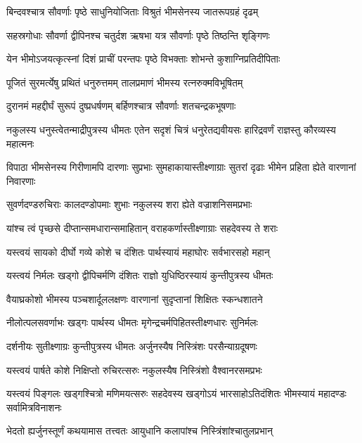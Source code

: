 \twolineshloka
{बिन्दवश्चात्र सौवर्णाः पृष्ठे साधुनियोजिताः}
{विश्रुतं भीमसेनस्य जातरूपग्रहं दृढम्}


\twolineshloka
{सहस्रगोधाः सौवर्णा द्वीपिनश्च चतुर्दश}
{ऋषभा यत्र सौवर्णाः पृष्ठे तिष्ठन्ति शृङ्गिणः}


\twolineshloka
{येन भीमोऽजयत्कृत्स्नां दिशं प्राचीं परन्तपः}
{पृष्ठे विभक्ताः शोभन्ते कुशाग्निप्रतिदीपिताः}


\twolineshloka
{पूजितं सुरमर्त्येषु प्रथितं धनुरुत्तमम्}
{तालप्रमाणं भीमस्य रत्नरुक्मविभूषितम्}


\twolineshloka
{दुरानमं महद्दीर्घं सुरूपं दुष्प्रधर्षणम्}
{बर्हिणश्चात्र सौवर्णाः शतचन्द्रकभूषणाः}


\threelineshloka
{नकुलस्य धनुस्त्वेतन्माद्रीपुत्रस्य धीमतः}
{एतेन सदृशं चित्रं धनुरेतद्यवीयसः}
{हारिद्रवर्णं राज्ञस्तु कौरव्यस्य महात्मनः}


\threelineshloka
{विपाठा भीमसेनस्य गिरीणामपि दारणाः}
{सुप्रभाः सुमहाकायास्तीक्ष्णाग्राः सुतरां दृढाः}
{भीमेन प्रहिता ह्येते वारणानां निवारणाः}


\twolineshloka
{सुवर्णदण्डरुचिराः कालदण्डोपमाः शुभाः}
{नकुलस्य शरा ह्येते वज्राशनिसमप्रभाः}


\twolineshloka
{यांश्च त्वं पृच्छसे दीप्तान्समधारान्समाहितान्}
{वराहकर्णास्तीक्ष्णाग्राः सहदेवस्य ते शराः}


\twolineshloka
{यस्त्वयं सायको दीर्घो गव्ये कोशे च दंशितः}
{पार्थस्यायं महाघोरः सर्वभारसहो महान्}


\twolineshloka
{यस्त्वयं निर्मलः खड्गो द्वीपिचर्मणि दंशितः}
{राज्ञो युधिष्ठिरस्यायं कुन्तीपुत्रस्य धीमतः}



\twolineshloka
{वैयाघ्रकोशो भीमस्य पञ्चशार्दूललक्षणः}
{वारणानां सुदृप्तानां शिक्षितः स्कन्धशातने}


\twolineshloka
{नीलोत्पलसवर्णाभः खड्गः पार्थस्य धीमतः}
{मृगेन्द्रचर्मपिहितस्तीक्ष्णधारः सुनिर्मलः}


\twolineshloka
{दर्शनीयः सुतीक्ष्णाग्रः कुन्तीपुत्रस्य धीमतः}
{अर्जुनस्यैष निस्त्रिंशः परसैन्याग्रदूषणः}


\twolineshloka
{यस्त्वयं पार्षते कोशे निक्षिप्तो रुचिरत्सरुः}
{नकुलस्यैष निस्त्रिंशो वैश्वानरसमप्रभः}


\threelineshloka
{यस्त्वयं पिङ्गलः खड्गश्चित्रो मणिमयत्सरुः}
{सहदेवस्य खड्गोऽयं भारसाहोऽतिदंशितः}
{भीमस्यायं महादण्डः सर्वामित्रविनाशनः}



\twolineshloka
{भेदतो ह्यर्जुनस्तूर्णं कथयामास तत्त्वतः}
{आयुधानि कलापांश्च निस्त्रिंशांश्चातुलप्रभान्}

